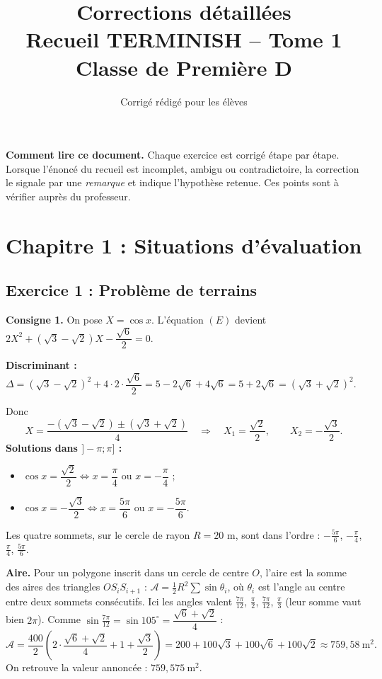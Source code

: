 \documentclass[11pt,a4paper]{article}
\title{Corrections d\'etaill\'ees\\Recueil TERMINISH -- Tome 1\\Classe de Premi\`ere D}
\author{Corrig\'e r\'edig\'e pour les \'el\`eves}
\date{}
\begin{document}
\maketitle

\noindent\textbf{Comment lire ce document.} Chaque exercice est corrig\'e \'etape par \'etape.
Lorsque l'\'enonc\'e du recueil est incomplet, ambigu ou contradictoire, la correction le signale
par une \emph{remarque} et indique l'hypoth\`ese retenue. Ces points sont \`a v\'erifier aupr\`es du professeur.

\tableofcontents
\newpage

\section{Chapitre 1 : Situations d'\'evaluation}

\subsection{Exercice 1 : Probl\`eme de terrains}

\textbf{Consigne 1.} On pose $X=\cos x$. L'\'equation $(E)$ devient
$2X^2+(\sqrt3-\sqrt2)X-\dfrac{\sqrt6}{2}=0$.

\medskip\noindent\textbf{Discriminant :}
$\Delta=(\sqrt3-\sqrt2)^2+4\cdot 2\cdot\dfrac{\sqrt6}{2}=5-2\sqrt6+4\sqrt6=5+2\sqrt6=(\sqrt3+\sqrt2)^2$.

\noindent Donc
\[
X=\frac{-(\sqrt3-\sqrt2)\pm(\sqrt3+\sqrt2)}{4}
\quad\Longrightarrow\quad
X_1=\frac{\sqrt2}{2},\qquad X_2=-\frac{\sqrt3}{2}.
\]
\noindent\textbf{Solutions dans $]-\pi;\pi]$ :}
\begin{itemize}
  \item $\cos x=\dfrac{\sqrt2}{2}\iff x=\dfrac{\pi}{4}$ ou $x=-\dfrac{\pi}{4}$ ;
  \item $\cos x=-\dfrac{\sqrt3}{2}\iff x=\dfrac{5\pi}{6}$ ou $x=-\dfrac{5\pi}{6}$.
\end{itemize}
Les quatre sommets, sur le cercle de rayon $R=20$ m, sont dans l'ordre :
$-\frac{5\pi}{6}$, $-\frac{\pi}{4}$, $\frac{\pi}{4}$, $\frac{5\pi}{6}$.

\medskip\noindent\textbf{Aire.} Pour un polygone inscrit dans un cercle de centre $O$, l'aire est la somme
des aires des triangles $OS_iS_{i+1}$ : $\mathcal A=\frac12R^2\sum\sin\theta_i$, o\`u $\theta_i$ est l'angle
au centre entre deux sommets cons\'ecutifs. Ici les angles valent $\frac{7\pi}{12}$, $\frac{\pi}{2}$,
$\frac{7\pi}{12}$, $\frac{\pi}{3}$ (leur somme vaut bien $2\pi$). Comme
$\sin\frac{7\pi}{12}=\sin105^\circ=\dfrac{\sqrt6+\sqrt2}{4}$ :
\[
\mathcal A=\frac{400}{2}\left(2\cdot\frac{\sqrt6+\sqrt2}{4}+1+\frac{\sqrt3}{2}\right)
=200+100\sqrt3+100\sqrt6+100\sqrt2\approx 759{,}58\ \text{m}^2 .
\]
On retrouve la valeur annonc\'ee : $759{,}575\ \text{m}^2$.
\end{document}
